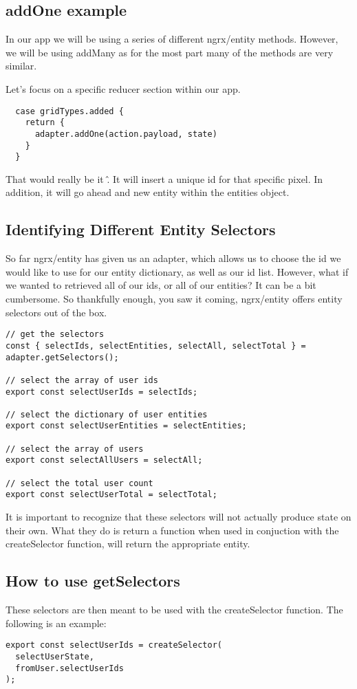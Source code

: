 \subsection{ addOne example }
In our app we will be using a series of different ngrx/entity methods. However,
we will be using addMany as for the most part many of the methods are very
similar.

Let's focus on a specific reducer section within our app.
\begin{verbatim}
  case gridTypes.added {
    return {
      adapter.addOne(action.payload, state)
    }
  }
\end{verbatim}

That would really be it \^. It will insert a unique id for that specific pixel.
In addition, it will go ahead and new entity within the entities object.

\subsection{ Identifying Different Entity Selectors }
So far ngrx/entity has given us an adapter, which allows us to choose the id
we would like to use for our entity dictionary, as well as our id list. However,
what if we wanted to retrieved all of our ids, or all of our entities? It can
be a bit cumbersome. So thankfully enough, you saw it coming, ngrx/entity
offers entity selectors out of the box.

\begin{verbatim}
// get the selectors
const { selectIds, selectEntities, selectAll, selectTotal } = adapter.getSelectors();

// select the array of user ids
export const selectUserIds = selectIds;

// select the dictionary of user entities
export const selectUserEntities = selectEntities;

// select the array of users
export const selectAllUsers = selectAll;

// select the total user count
export const selectUserTotal = selectTotal;
\end{verbatim}

It is important to recognize that these selectors will not actually produce
state on their own. What they do is return a function when used in
conjuction with the createSelector function, will return the appropriate
entity.

\subsection{ How to use getSelectors }
These selectors are then meant to be used with the createSelector function.
The following is an example:
\begin{verbatim}
export const selectUserIds = createSelector(
  selectUserState,
  fromUser.selectUserIds
);
\end{verbatim}


